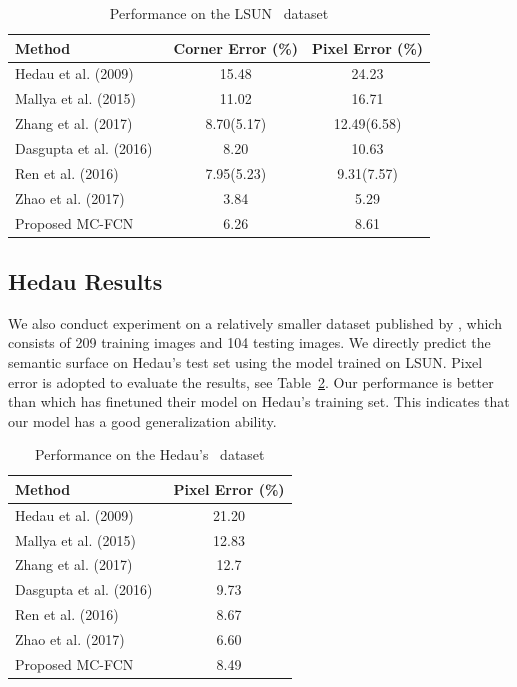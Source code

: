 \begin{table}
	\centering 
	\begin{tabular}{l|c|c}
		\hline 
		Method & Corner Error (\%) & Pixel Error (\%) \\
		\hline
		Hedau et al. (2009)~\cite{hedau2009recovering} & 15.48 & 24.23 \\
		Mallya et al. (2015)~\cite{mallya2015learning} & 11.02 & 16.71 \\
		Zhang et al. (2017)~\cite{zhang2017learning} & 8.70(5.17) & 12.49(6.58) \\
		Dasgupta et al. (2016)~\cite{dasgupta2016delay} & 8.20 & 10.63 \\
		Ren et al. (2016)~\cite{ren2016three} & 7.95(5.23) & 9.31(7.57) \\
		Zhao et al. (2017)~\cite{zhao2017physics} & 3.84 & 5.29 \\
		Proposed MC-FCN & 6.26 & 8.61 \\
		\hline
	\end{tabular}
	\caption{Performance on the LSUN~\cite{zhang2015large} dataset}	
	\label{table:comparison-lsun}
\end{table}

\subsection{Hedau Results}
\label{sec:Hedau}
We also conduct experiment on a relatively smaller dataset published by \cite{hedau2009recovering}, which consists of 209 training images and 104 testing images. We directly predict the semantic surface on Hedau's test set using the model trained on LSUN. Pixel error is adopted to evaluate the results, see Table~\ref{table:comparison-hedau}. Our performance is better than \cite{ren2016three} which has finetuned their model on Hedau's training set. This indicates that our model has a good generalization ability.

\begin{table}
	\centering 
	\begin{tabular}{l|c}
		\hline 
		Method & Pixel Error (\%) \\
		\hline
		Hedau et al. (2009)~\cite{hedau2009recovering} & 21.20 \\
		Mallya et al. (2015)~\cite{mallya2015learning} & 12.83 \\
		Zhang et al. (2017)~\cite{zhang2017learning} & 12.7 \\
		Dasgupta et al. (2016)~\cite{dasgupta2016delay} & 9.73 \\
		Ren et al. (2016)~\cite{ren2016coarse} & 8.67 \\
		Zhao et al. (2017)~\cite{zhao2017physics} & 6.60 \\
		Proposed MC-FCN & 8.49 \\
		\hline
	\end{tabular}
	\caption{Performance on the Hedau's~\cite{hedau2009recovering} dataset}
	\label{table:comparison-hedau}
\end{table}


